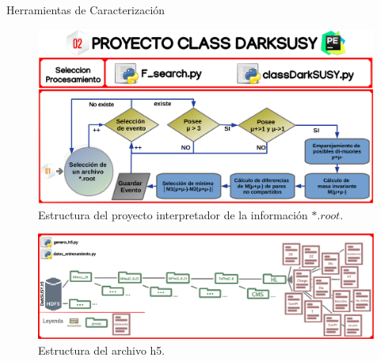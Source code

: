 \begin{frame}{Herramientas de Caracterización}
\begin{figure}[h]
\centering
\includegraphics[width=1\textwidth]{Imag/class_darksusy.png}
\caption{Estructura del proyecto interpretador de la información $*.root$.}
\end{figure}

\framebreak

\begin{figure}[h]
\centering
\includegraphics[width=1\textwidth]{Imag/class_darksusy3.png}
\caption{Estructura del archivo h5.}
\end{figure}
\end{frame}



